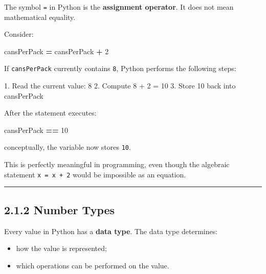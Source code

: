 \documentclass[
]{article}
\newenvironment{Shaded}{\begin{snugshade}}{\end{snugshade}}
\newcommand{\DecValTok}[1]{\textcolor[rgb]{0.00,0.00,0.81}{#1}}
\newcommand{\NormalTok}[1]{#1}
\newcommand{\OperatorTok}[1]{\textcolor[rgb]{0.81,0.36,0.00}{\textbf{#1}}}
\providecommand{\tightlist}{%
  \setlength{\itemsep}{0pt}\setlength{\parskip}{0pt}}
\begin{document}
The symbol \texttt{=} in Python is the \textbf{assignment operator}. It
does not mean mathematical equality.

Consider:

\begin{Shaded}
\begin{Highlighting}[]
\NormalTok{cansPerPack }\OperatorTok{=}\NormalTok{ cansPerPack }\OperatorTok{+} \DecValTok{2}
\end{Highlighting}
\end{Shaded}

If \texttt{cansPerPack} currently contains \texttt{8}, Python performs
the following steps:

\begin{Shaded}
\begin{Highlighting}[]
\NormalTok{1. Read the current value: 8}
\NormalTok{2. Compute 8 + 2 = 10}
\NormalTok{3. Store 10 back into cansPerPack}
\end{Highlighting}
\end{Shaded}

After the statement executes:

\begin{Shaded}
\begin{Highlighting}[]
\NormalTok{cansPerPack }\OperatorTok{==} \DecValTok{10}
\end{Highlighting}
\end{Shaded}

conceptually, the variable now stores \texttt{10}.

This is perfectly meaningful in programming, even though the algebraic
statement \texttt{x\ =\ x\ +\ 2} would be impossible as an equation.

\begin{center}\rule{0.5\linewidth}{0.5pt}\end{center}

\subsection{2.1.2 Number Types}\label{number-types}

Every value in Python has a \textbf{data type}. The data type
determines:

\begin{itemize}
\tightlist
\item
  how the value is represented;
\item
  which operations can be performed on the value.
\end{itemize}
\end{document}
